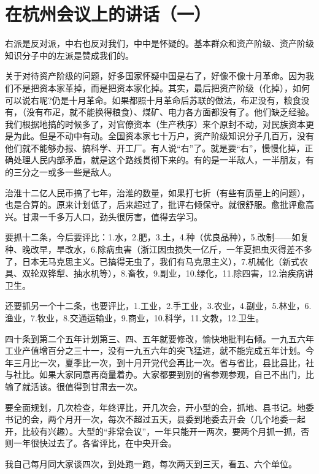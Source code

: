 \section[在杭州会议上的讲话（一）（一九五八年一月三日）]{在杭州会议上的讲话（一）}


右派是反对派，中右也反对我们，中中是怀疑的。基本群众和资产阶级、资产阶级知识分子中的左派是赞成我们的。

关于对待资产阶级的问题，好多国家怀疑中国是右了，好像不像十月革命。因为我们不是把资本家革掉，而是把资本家化掉。其实，最后把资产阶级（化掉），如何可以说右呢?仍是十月革命。如果都照十月革命后苏联的做法，布疋没有，粮食没有，（没有布疋，就不能换得粮食）、煤矿、电力各方面都没有了。他们缺乏经验。我们根据地搞的时候多了，对官僚资本（生产秩序）来个原封不动，对民族资本更是为此。但是不动中有动。全国资本家七十万户，资产阶级知识分子几百万，没有他们就不能够办报、搞科学、开工厂。有人说“右”了。就是要“右”，慢慢化掉，正确处理人民内部矛盾，就是这个路线贯彻下来的。有的是一半敌人，一半朋友，有的三分之一或多一些是敌人。

治淮十二亿人民币搞了七年，治淮的数量，如果打七折（有些有质量上的问题），也是合算的。原来计划低了，后来超过了，批评右倾保守。就很舒服。愈批评愈高兴。甘肃一千多万人口，劲头很厉害，值得去学习。

要抓十二条，今后要评比：1.水，2.肥，3.土，4.种（优良品种），5.改制——如复种、晚改早，旱改水，6.除病虫害（浙江因虫损失一亿斤，一年夏把虫灭得差不多了，日本无马克思主义。已搞得无虫了，我们有马克思主义），7.机械化（新式农具、双轮双铧犁、抽水机等），8.畜牧，9.副业，10.绿化，11.除四害，12.治疾病讲卫生。

还要抓另一个十二条，也要评比，1.工业，2.手工业，3.农业，4.副业，5.林业，6.渔业，7.牧业，8.交通运输业，9.商业，10.科学，11.文教，12.卫生。

四十条到第二个五年计划第三、四、五年就要修改，愉快地批判右倾。一九五六年工业产值增百分之三十一，没有一九五六年的突飞猛进，就不能完成五年计划。今年三月比一次，夏季比一次，到十月开党代会再比一次。省与省比，县比县比，社与社比。如果大家同意再商量着办。大家都要到别的省参观参观，自己不出门，比输了就活该。很值得到甘肃去一次。

要全面规划，几次检查，年终评比，开几次会，开小型的会，抓地、县书记。地委书记的会，两个月开一次，每次不超过五天，县委到地委去开会（几个地委一起开，比较有兴趣）。大型的“非常会议”，一年只能开一两次，要两个月抓一抓，否则一年很快过去了。各省评比，在中央开会。

我自己每月同大家谈四次，到处跑一跑，每次两天到三天，看五、六个单位。

